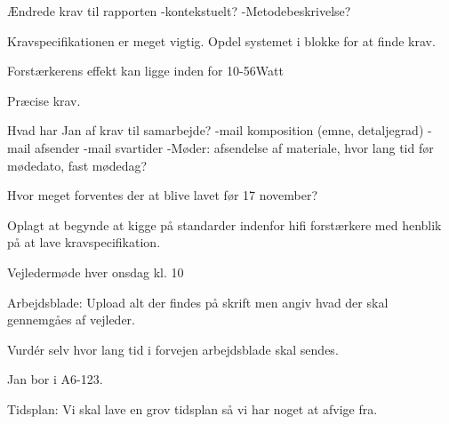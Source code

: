 Ændrede krav til rapporten
-kontekstuelt?
-Metodebeskrivelse?

Kravspecifikationen er meget vigtig. Opdel systemet i blokke for at finde krav.

Forstærkerens effekt kan ligge inden for 10-56Watt

Præcise krav.



Hvad har Jan af krav til samarbejde?
-mail komposition (emne, detaljegrad)
-mail afsender
-mail svartider
-Møder: afsendelse af materiale, hvor lang tid før mødedato, fast mødedag?

Hvor meget forventes der at blive lavet før 17 november?

Oplagt at begynde at kigge på standarder indenfor hifi forstærkere med henblik på at lave kravspecifikation.


Vejledermøde hver onsdag kl. 10

Arbejdsblade: Upload alt der findes på skrift men angiv hvad der skal gennemgåes af vejleder.

Vurdér selv hvor lang tid i forvejen arbejdsblade skal sendes.

Jan bor i A6-123.

Tidsplan: Vi skal lave en grov tidsplan så vi har noget at afvige fra.


